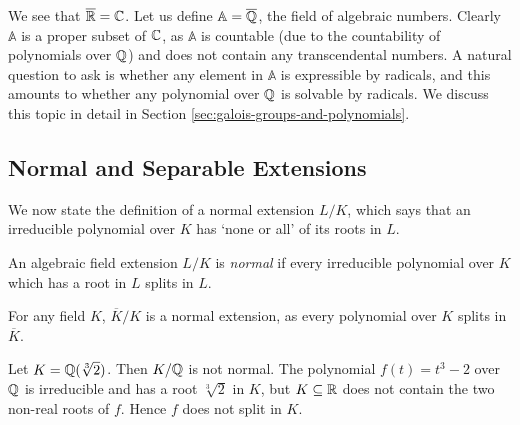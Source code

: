 We see that $\overline {\mathbb R}  =  \mathbb C$. Let us define $\mathbb A = \overline {\mathbb Q}$, the field of algebraic numbers. Clearly $\mathbb A$ is a proper subset of $\mathbb C$, as $\mathbb A$ is countable (due to the countability of polynomials over $\mathbb Q$) and does not contain any transcendental numbers. A natural question to ask is whether any element in $\mathbb A$ is expressible by radicals, and this amounts to whether any polynomial over $\mathbb Q$ is solvable by radicals. We discuss this topic in detail in Section \ref{sec:galois-groups-and-polynomials}. 

%
%

%



\subsection{Normal and Separable Extensions}

We now state the definition of a normal extension $L/K$, which says that an irreducible polynomial over $K$ has `none or all' of its roots in $L$. 

\begin{definition}
    An algebraic field extension $L/ K$ is \textit{normal} if every irreducible polynomial over $K$ which has a root in $L$ splits in $L$. 
\end{definition}

\begin{example}
	For any field $K$, $\overline K / K$ is a normal extension, as every polynomial over $K$ splits in $\overline K$. 
\end{example}


\begin{example}
    Let $K = \mathbb Q(\sqrt[3]{2})$. Then $K / \mathbb Q$ is not normal. The polynomial $f(t) = t^3 - 2$ over $\mathbb Q$ is irreducible and has a root $\sqrt[3]{2}$ in $K$, but $K \subseteq \mathbb R$ does not contain the two non-real roots of $f$. Hence $f$ does not split in $K$.
\end{example}

